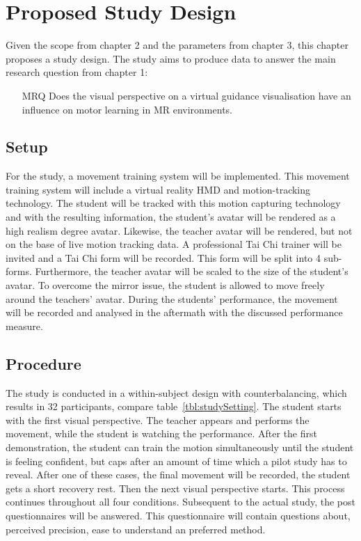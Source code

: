 \chapter{Proposed Study Design}
Given the scope from chapter 2 and the parameters from chapter 3, this chapter proposes a study design. The study aims to produce data to answer the main research question from chapter 1:
\begin{itemize}
	\item[MRQ] Does the visual perspective on a virtual guidance visualisation have an influence on motor learning in MR environments.
\end{itemize}

\section{Setup}
For the study, a movement training system will be implemented. This movement training system will include a virtual reality HMD and motion-tracking technology. The student will be tracked with this motion capturing technology and with the resulting information, the student's avatar will be rendered as a high realism degree avatar. Likewise, the teacher avatar will be rendered, but not on the base of live motion tracking data. A professional Tai Chi trainer will be invited and a Tai Chi form will be recorded. This form will be split into 4 sub-forms. Furthermore, the teacher avatar will be scaled to the size of the student's avatar. To overcome the mirror issue, the student is allowed to move freely around the teachers' avatar. During the students' performance, the movement will be recorded and analysed in the aftermath with the discussed performance measure. 

\section{Procedure}
The study is conducted in a within-subject design with counterbalancing, which results in 32 participants, compare table~\ref{tbl:studySetting}. The student starts with the first visual perspective. The teacher appears and performs the movement, while the student is watching the performance. After the first demonstration, the student can train the motion simultaneously until the student is feeling confident, but caps after an amount of time which a pilot study has to reveal. After one of these cases, the final movement will be recorded, the student gets a short recovery rest. Then the next visual perspective starts. This process continues throughout all four conditions. Subsequent to the actual study, the post questionnaires will be answered. This questionnaire will contain questions about, perceived precision, ease to understand an preferred method.

